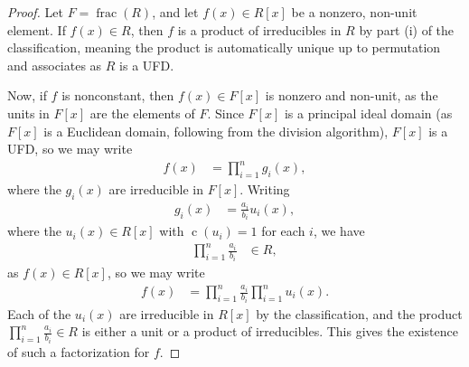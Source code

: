 \documentclass[10pt]{mypackage}
\begin{document}
\begin{proof}
  Let $F = \operatorname{frac}(R)$, and let $f(x)\in R[x]$ be a nonzero, non-unit element. If $f(x)\in R$, then $f$ is a product of irreducibles in $R$ by part (i) of the classification, meaning the product is automatically unique up to permutation and associates as $R$ is a UFD.\newline

  Now, if $f$ is nonconstant, then $f(x)\in F[x]$ is nonzero and non-unit, as the units in $F[x]$ are the elements of $F$. Since $F[x]$ is a principal ideal domain (as $F[x]$ is a Euclidean domain, following from the division algorithm), $F[x]$ is a UFD, so we may write
  \begin{align*}
    f(x) &= \prod_{i=1}^{n}g_i(x),
  \end{align*}
  where the $g_i(x)$ are irreducible in $F[x]$. Writing
  \begin{align*}
    g_i(x) &= \frac{a_i}{b_i} u_i(x),
  \end{align*}
  where the $u_i(x)\in R[x]$ with $\operatorname{c}\left( u_i \right) = 1$ for each $i$, we have
  \begin{align*}
    \prod_{i=1}^{n}\frac{a_i}{b_i} &\in R,
  \end{align*}
  as $f(x)\in R[x]$, so we may write
  \begin{align*}
    f(x) &= \prod_{i=1}^{n} \frac{a_i}{b_i} \prod_{i=1}^{n}u_i(x).
  \end{align*}
  Each of the $u_i(x)$ are irreducible in $R[x]$ by the classification, and the product $\prod_{i=1}^{n}\frac{a_i}{b_i}\in R$ is either a unit or a product of irreducibles. This gives the existence of such a factorization for $f$.\newline


\end{proof}
\end{document}

